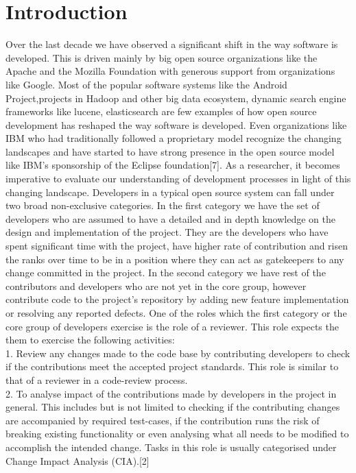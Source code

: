 
\section{Introduction}
\label{sec:intro}

Over the last decade we have observed a significant shift in the way software is developed. This is driven mainly by big open source organizations like the Apache and the Mozilla Foundation with generous support from organizations like Google. Most of the popular software systems like the Android Project,projects in Hadoop and other big data ecosystem, dynamic search engine frameworks like lucene, elasticsearch are few examples of how open source development has reshaped the way software is developed. Even organizations like IBM who had traditionally followed a proprietary model recognize the changing landscapes and have started to have strong presence in the open source model like IBM's sponsorship of the Eclipse foundation[7]. As a researcher, it becomes imperative to evaluate our understanding of development processes in light of this changing landscape.
Developers in a typical open source system can fall under two broad non-exclusive categories. In the first category we have the set of developers who are assumed to have a detailed and in depth knowledge on the design and implementation of the project. They are the developers who have spent significant time with the project, have higher rate of contribution and risen the ranks over time to be in a position where they can act as gatekeepers to any change committed in the project. In the second category we have rest of the contributors and developers who are not yet in the core group, however contribute code to the project's  repository by adding new feature implementation or resolving any reported defects. One of the roles which the first category or the core group of developers exercise is the role of a reviewer. This role expects the them to exercise the following activities:\\
1. Review any changes made to the code base by contributing developers to check if the contributions meet the accepted project standards. This role is similar to that of a reviewer in a code-review process.\\
2. To analyse impact of the contributions made by developers in the project in general. This includes but is not limited to checking if the contributing changes are accompanied by required test-cases, if the contribution runs the risk of breaking existing functionality or even analysing what all needs to be modified to accomplish the intended change. Tasks in this role is usually categorised under Change Impact Analysis (CIA).[2] \\
